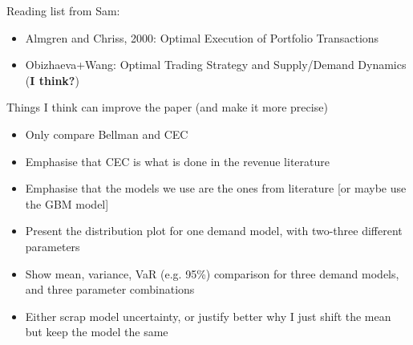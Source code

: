 \documentclass[a4paper,12pt]{article}
\begin{document}
Reading list from Sam:
\begin{itemize}
\item Almgren and Chriss, 2000: Optimal Execution of Portfolio
  Transactions
\item Obizhaeva+Wang: Optimal Trading Strategy
and
Supply/Demand Dynamics (\textbf{I think?})
\end{itemize}

Things I think can improve the paper (and make it more precise)
\begin{itemize}
\item Only compare Bellman and CEC
\item Emphasise that CEC is what is done in the revenue literature
\item Emphasise that the models we use are the ones from literature
  [or maybe use the GBM model]
\item Present the distribution plot for one demand model, with
  two-three different parameters
\item Show mean, variance, VaR (e.g. 95\%) comparison for three demand
  models, and three parameter combinations
\item Either scrap model uncertainty, or justify better why I just
  shift the mean but keep the model the same
\end{itemize}






% 


\clearpage




%

\end{document}
